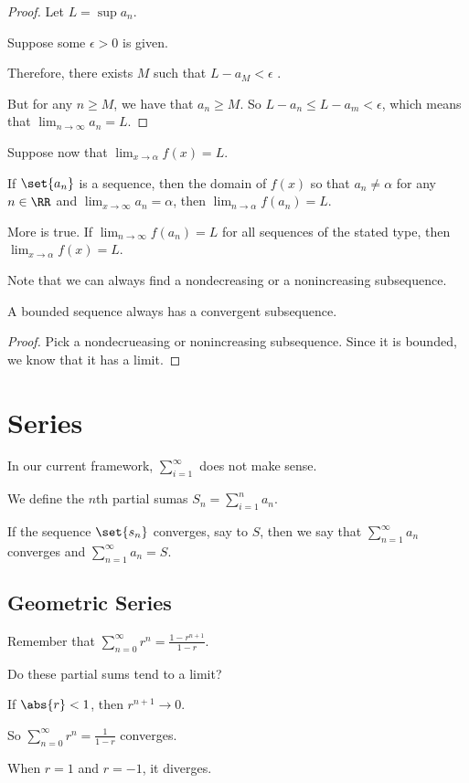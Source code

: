 \documentclass[11pt]{scrartcl}
\begin{document}
\begin{proof}
  \hfill

  Let $L  = \sup a_n$.

  Suppose some $\epsilon > 0$ is given.

  Therefore, there exists $M$ such that $L-a_M< \epsilon$ .

  But for any $n \geq M$, we have that $a_n\geq M$. So
  $L - a_n\leq L-a_m <\epsilon$, which means that
  $\lim_{n\to \infty}a_n = L$.
\end{proof}

Suppose now that $\lim_{x\to\alpha}f(x) = L$.

If $\set{a_n}$ is a sequence, then the domain of $f(x)$ so that
$a_n\neq \alpha$ for any $n\in\RR$ and
$\lim_{x\to \infty}a_n = \alpha$, then $\lim_{n\to\alpha} f(a_n) = L$.

More is true. If $\lim_{n\to\infty}f(a_n) = L$ for all sequences of the stated type, then $\lim_{x\to \alpha}f(x) = L$.

Note that we can always find a nondecreasing or a nonincreasing subsequence.

\begin{theorem}
A bounded sequence always has a convergent subsequence.
\end{theorem}

\begin{proof}
  \hfill

Pick a nondecrueasing or nonincreasing subsequence. Since it is bounded, we know that it has a limit.
\end{proof}

\section{Series}

In our current framework, $\sum_{i=1}^{\infty}$ does not make sense.

We define the $n$th partial sumas $S_n = \sum_{i=1}^na_n$.

If the sequence $\set{s_n}$ converges, say to $S$, then we say that
$\sum_{n=1}^{\infty} a_n $ converges and
$\sum_{n=1}^{\infty} a_n = S$.

\subsection{Geometric Series}

Remember that $\sum_{n=0}^{\infty}r^n= \frac{1-r^{n+1}}{1-r}$.

Do these partial sums tend to a limit?

If $\abs{r}< 1$, then $r^{n+1} \to 0$.

So $\sum_{n=0}^{\infty}r^n = \frac{1}{1-r}$ converges.

When $r = 1$ and $r=-1$, it diverges.
\end{document}

